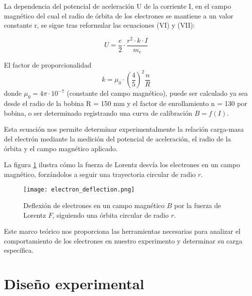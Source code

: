 \documentclass[twocolumn,a4paper,11pt]{scrartcl}
\begin{document}
La dependencia del potencial de aceleración U de la corriente I, en el campo magnético del cual el radio de órbita de los electrones se mantiene a un valor constante r, se sigue tras reformular las ecuaciones (VI) y (VII):

\begin{equation}
U = \frac{e}{2} \cdot \frac{r^2 \cdot k \cdot I}{m_e}
\end{equation}

El factor de proporcionalidad
\begin{equation}
k = \mu_0 \cdot \left(\frac{4}{5}\right)^2 \frac{n}{R}
\end{equation}
donde $\mu_0 = 4\pi \cdot 10^{-7}$ (constante del campo magnético),
puede ser calculado ya sea desde el radio de la bobina R = 150 mm y el factor de enrollamiento n = 130 por bobina, o ser determinado registrando una curva de calibración $B = f(I)$.


Esta ecuación nos permite determinar experimentalmente la relación carga-masa del electrón mediante la medición del potencial de aceleración, el radio de la órbita y el campo magnético aplicado.

La figura \ref{fig:electron_deflection} ilustra cómo la fuerza de Lorentz desvía los electrones en un campo magnético, forzándolos a seguir una trayectoria circular de radio $r$.

\begin{figure}[h]
    \centering
    \texttt{[image: electron\_deflection.png]}
    \caption{Deflexión de electrones en un campo magnético $B$ por la fuerza de Lorentz $F$, siguiendo una órbita circular de radio $r$.}
    \label{fig:electron_deflection}
\end{figure}

Este marco teórico nos proporciona las herramientas necesarias para analizar el comportamiento de los electrones en nuestro experimento y determinar su carga específica.

\section{Diseño experimental}
\end{document}
